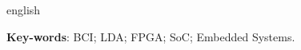 \begin{resumo}[Abstract]
 \begin{otherlanguage*}{english}


   \vspace{\onelineskip}
 
   \noindent 
   \textbf{Key-words}: BCI; LDA; FPGA; SoC; Embedded Systems.
 \end{otherlanguage*}
\end{resumo}
